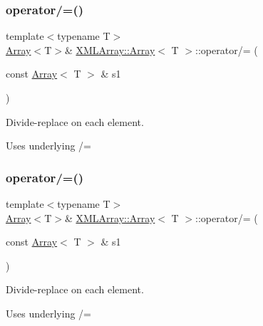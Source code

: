 \subsubsection{\texorpdfstring{operator/=()}{operator/=()}\hspace{0.1cm}{\footnotesize\ttfamily [2/6]}}
{\footnotesize\ttfamily template$<$typename T$>$ \\
\mbox{\hyperlink{classXMLArray_1_1Array}{Array}}$<$T$>$\& \mbox{\hyperlink{classXMLArray_1_1Array}{X\+M\+L\+Array\+::\+Array}}$<$ T $>$\+::operator/= (\begin{DoxyParamCaption}\item[{const \mbox{\hyperlink{classXMLArray_1_1Array}{Array}}$<$ T $>$ \&}]{s1 }\end{DoxyParamCaption})\hspace{0.3cm}{\ttfamily [inline]}}



Divide-\/replace on each element. 

Uses underlying /= \mbox{\label{classXMLArray_1_1Array_ad729e7678e412fb09104173dbe12a1fc}} 
\subsubsection{\texorpdfstring{operator/=()}{operator/=()}\hspace{0.1cm}{\footnotesize\ttfamily [3/6]}}
{\footnotesize\ttfamily template$<$typename T$>$ \\
\mbox{\hyperlink{classXMLArray_1_1Array}{Array}}$<$T$>$\& \mbox{\hyperlink{classXMLArray_1_1Array}{X\+M\+L\+Array\+::\+Array}}$<$ T $>$\+::operator/= (\begin{DoxyParamCaption}\item[{const \mbox{\hyperlink{classXMLArray_1_1Array}{Array}}$<$ T $>$ \&}]{s1 }\end{DoxyParamCaption})\hspace{0.3cm}{\ttfamily [inline]}}



Divide-\/replace on each element. 

Uses underlying /= \mbox{\label{classXMLArray_1_1Array_add7ef0354bf795511a654f1241da3318}} 
